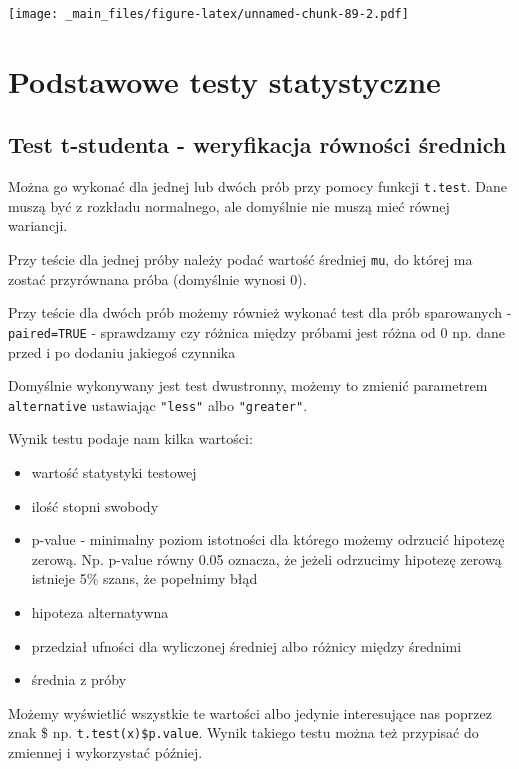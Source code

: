 \documentclass[
]{book}
\begin{document}
\texttt{[image: \_main\_files/figure-latex/unnamed-chunk-89-2.pdf]}

\hypertarget{podstawowe-testy-statystyczne}{%
\section{Podstawowe testy statystyczne}\label{podstawowe-testy-statystyczne}}

\hypertarget{test-t-studenta---weryfikacja-ruxf3wnoux15bci-ux15brednich}{%
\subsection{Test t-studenta - weryfikacja równości średnich}\label{test-t-studenta---weryfikacja-ruxf3wnoux15bci-ux15brednich}}

Można go wykonać dla jednej lub dwóch prób przy pomocy funkcji \texttt{t.test}. Dane muszą być z rozkładu normalnego, ale domyślnie nie muszą mieć równej wariancji.

Przy teście dla jednej próby należy podać wartość średniej \texttt{mu}, do której ma zostać przyrównana próba (domyślnie wynosi 0).

Przy teście dla dwóch prób możemy również wykonać test dla prób sparowanych - \texttt{paired=TRUE} - sprawdzamy czy różnica między próbami jest różna od 0 np. dane przed i po dodaniu jakiegoś czynnika

Domyślnie wykonywany jest test dwustronny, możemy to zmienić parametrem \texttt{alternative} ustawiając \texttt{"less"} albo \texttt{"greater"}.

Wynik testu podaje nam kilka wartości:

\begin{itemize}
\item
  wartość statystyki testowej
\item
  ilość stopni swobody
\item
  p-value - minimalny poziom istotności dla którego możemy odrzucić hipotezę zerową. Np. p-value równy 0.05 oznacza, że jeżeli odrzucimy hipotezę zerową istnieje 5\% szans, że popełnimy błąd
\item
  hipoteza alternatywna
\item
  przedział ufności dla wyliczonej średniej albo różnicy między średnimi
\item
  średnia z próby
\end{itemize}

Możemy wyświetlić wszystkie te wartości albo jedynie interesujące nas poprzez znak \$ np. \texttt{t.test(x)\$p.value}. Wynik takiego testu można też przypisać do zmiennej i wykorzystać później.
\end{document}
